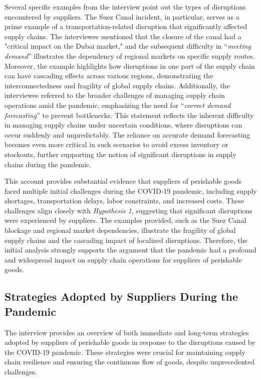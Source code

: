 Several specific examples from the interview point out the types of disruptions encountered by suppliers. The Suez Canal incident, in particular, serves as a prime example of a transportation-related disruption that significantly affected supply chains. The interviewee mentioned that the closure of the canal had a "critical impact on the Dubai market," and the subsequent difficulty in “\textit{meeting demand}” illustrates the dependency of regional markets on specific supply routes. Moreover, the example highlights how disruptions in one part of the supply chain can have cascading effects across various regions, demonstrating the interconnectedness and fragility of global supply chains. Additionally, the interviewee referred to the broader challenges of managing supply chain operations amid the pandemic, emphasizing the need for “\textit{correct demand forecasting}” to prevent bottlenecks. This statement reflects the inherent difficulty in managing supply chains under uncertain conditions, where disruptions can occur suddenly and unpredictably. The reliance on accurate demand forecasting becomes even more critical in such scenarios to avoid excess inventory or stockouts, further supporting the notion of significant disruptions in supply chains during the pandemic. 

This account provides substantial evidence that suppliers of perishable goods faced multiple initial challenges during the COVID-19 pandemic, including supply shortages, transportation delays, labor constraints, and increased costs. These challenges align closely with \textit{Hypothesis 1}, suggesting that significant disruptions were experienced by suppliers. The examples provided, such as the Suez Canal blockage and regional market dependencies, illustrate the fragility of global supply chains and the cascading impact of localized disruptions. Therefore, the initial analysis strongly supports the argument that the pandemic had a profound and widespread impact on supply chain operations for suppliers of perishable goods.


\subsection{Strategies Adopted by Suppliers During the Pandemic}

The interview provides an overview of both immediate and long-term strategies adopted by suppliers of perishable goods in response to the disruptions caused by the COVID-19 pandemic. These strategies were crucial for maintaining supply chain resilience and ensuring the continuous flow of goods, despite unprecedented challenges.

